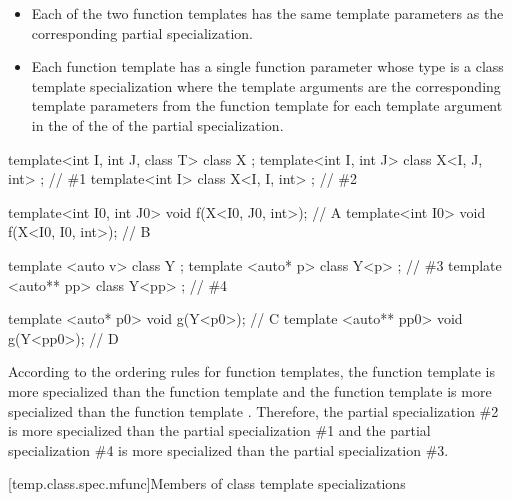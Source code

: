 \begin{itemize}
\item
Each of the two
function templates has the same template parameters as
the corresponding partial specialization.
\item
Each function template
has a single function parameter
whose type is a class template specialization where the template arguments
are the corresponding template parameters from the function template
for each template argument
in the 
of the 
of the partial specialization.
\end{itemize}

\pnum
\begin{example}
\begin{codeblock}
template<int I, int J, class T> class X { };
template<int I, int J>          class X<I, J, int> { }; // \#1
template<int I>                 class X<I, I, int> { }; // \#2

template<int I0, int J0> void f(X<I0, J0, int>);        // A
template<int I0>         void f(X<I0, I0, int>);        // B

template <auto v>    class Y { };
template <auto* p>   class Y<p> { };                    // \#3
template <auto** pp> class Y<pp> { };                   // \#4

template <auto* p0>   void g(Y<p0>);                    // C
template <auto** pp0> void g(Y<pp0>);                   // D
\end{codeblock}

According to the ordering rules for function templates,
the function template
is more specialized than the function template
and
the function template
is more specialized than the function template
.
Therefore, the partial specialization \#2
is more specialized than the partial specialization \#1
and the partial specialization \#4
is more specialized than the partial specialization \#3.
\end{example}

[temp.class.spec.mfunc]{Members of class template specializations}

